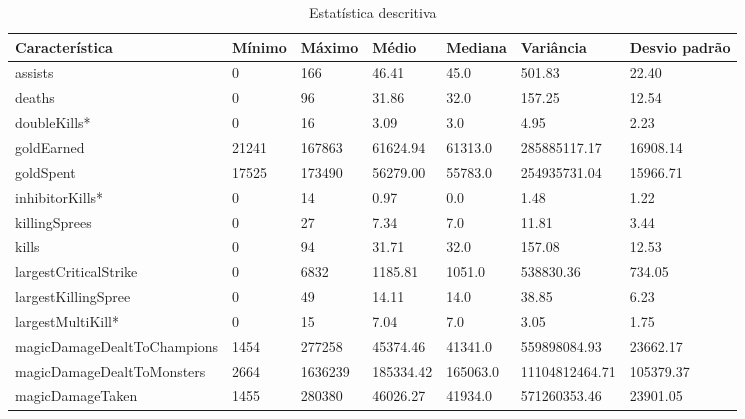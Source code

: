 \begin{table}
  \scriptsize
  \caption{Estatística descritiva}
  \label{tab:descriptive-statistics}
  \begin{tabular}{p{}p{}p{}p{}p{}p{}p{}}
  \toprule
\textbf{Característica}&                   \textbf{Mínimo}&      \textbf{Máximo}&      \textbf{Médio}&      \textbf{Mediana}&      \textbf{Variância}&      \textbf{Desvio padrão} \\
  \midrule
assists&                             0&     166&     46.41&     45.0&         501.83&     22.40\\ \hline
deaths&                              0&      96&     31.86&     32.0&         157.25&     12.54\\ \hline
doubleKills*&                         0&      16&      3.09&      3.0&           4.95&      2.23\\ \hline
goldEarned&                      21241&  167863&  61624.94&  61313.0&   285885117.17&  16908.14\\ \hline
goldSpent&                       17525&  173490&  56279.00&  55783.0&   254935731.04&  15966.71\\ \hline
inhibitorKills*&                      0&      14&      0.97&      0.0&           1.48&      1.22\\ \hline
killingSprees&                       0&      27&      7.34&      7.0&          11.81&      3.44\\ \hline
kills&                               0&      94&     31.71&     32.0&         157.08&     12.53\\ \hline
largestCriticalStrike&               0&    6832&   1185.81&   1051.0&      538830.36&    734.05\\ \hline
largestKillingSpree&                 0&      49&     14.11&     14.0&          38.85&      6.23\\ \hline
largestMultiKill*&                    0&      15&      7.04&      7.0&           3.05&      1.75\\ \hline
magicDamageDealtToChampions&      1454&  277258&  45374.46&  41341.0&   559898084.93&  23662.17\\ \hline
magicDamageDealtToMonsters&       2664& 1636239& 185334.42& 165063.0& 11104812464.71& 105379.37\\ \hline
magicDamageTaken&                 1455&  280380&  46026.27&  41934.0&   571260353.46&  23901.05\\ \hline

\end{tabular}
\end{table}
